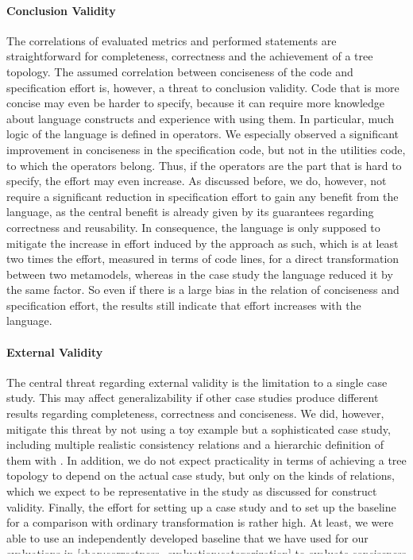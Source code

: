 \paragraph{Conclusion Validity}
The correlations of evaluated metrics and performed statements are straightforward for completeness, correctness and the achievement of a tree topology.
The assumed correlation between conciseness of the code and specification effort is, however, a threat to conclusion validity.
Code that is more concise may even be harder to specify, because it can require more knowledge about language constructs and experience with using them.
In particular, much logic of the \commonalities language is defined in operators.
We especially observed a significant improvement in conciseness in the specification code, but not in the utilities code, to which the operators belong.
Thus, if the operators are the part that is hard to specify, the effort may even increase.
As discussed before, we do, however, not require a significant reduction in specification effort to gain any benefit from the \commonalities language, as the central benefit is already given by its guarantees regarding correctness and reusability.
In consequence, the language is only supposed to mitigate the increase in effort induced by the \commonalities approach as such, which is at least two times the effort, measured in terms of code lines, for a direct transformation between two metamodels, whereas in the case study the language reduced it by the same factor.
So even if there is a large bias in the relation of conciseness and specification effort, the results still indicate that effort increases with the \commonalities language.

\paragraph{External Validity}
The central threat regarding external validity is the limitation to a single case study.
This may affect generalizability if other case studies produce different results regarding completeness, correctness and conciseness.
We did, however, mitigate this threat by not using a toy example but a sophisticated case study, including multiple realistic consistency relations and a hierarchic definition of them with \commonalities.
In addition, we do not expect practicality in terms of achieving a tree topology to depend on the actual case study, but only on the kinds of relations, which we expect to be representative in the study as discussed for construct validity.
Finally, the effort for setting up a case study and to set up the baseline for a comparison with ordinary transformation is rather high.
At least, we were able to use an independently developed baseline that we have used for our evaluations in \autoref{chap:correctness_evaluation:categorization} to evaluate conciseness of the \commonalities language.

